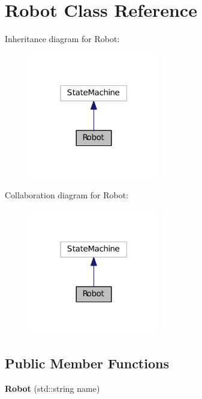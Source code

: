 \hypertarget{classRobot}{\section{Robot Class Reference}
\label{classRobot}
}


Inheritance diagram for Robot\+:
\nopagebreak
\begin{figure}[H]
\begin{center}
\leavevmode
\includegraphics[width=163pt]{classRobot__inherit__graph}
\end{center}
\end{figure}


Collaboration diagram for Robot\+:
\nopagebreak
\begin{figure}[H]
\begin{center}
\leavevmode
\includegraphics[width=163pt]{classRobot__coll__graph}
\end{center}
\end{figure}
\subsection*{Public Member Functions}
\begin{DoxyCompactItemize}
\item 
\hypertarget{classRobot_a76bf162c87054d8f1b3c6e1656caf46b}{{\bfseries Robot} (std\+::string name)}\label{classRobot_a76bf162c87054d8f1b3c6e1656caf46b}

\end{DoxyCompactItemize}
